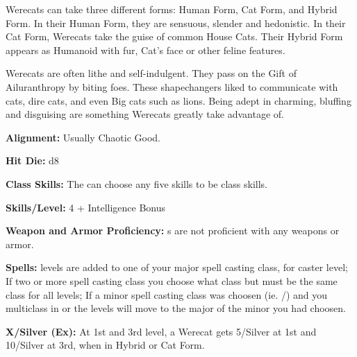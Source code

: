 
Werecats can take three different forms: Human Form, Cat Form, and Hybrid Form. In their Human Form, they are sensuous, slender and hedonistic. In their Cat Form, Werecats take the guise of common House Cats. Their Hybrid Form appears as Humanoid with fur, Cat's face or other feline features.

Werecats are often lithe and self-indulgent. They pass on the Gift of Ailuranthropy by biting foes. These shapechangers liked to communicate with cats, dire cats, and even Big cats such as lions. Being adept in charming, bluffing and disguising are something Werecats greatly take advantage of.

\textbf{Alignment:} Usually Chaotic Good.

\textbf{Hit Die:} d8

\textbf{Class Skills:} The \currentclassname{} can choose any five skills to be class skills.

\textbf{Skills/Level:} 4 + Intelligence Bonus

\modebab{}
\poorfor{}
\goodref{}
\poorwil{}

\begin{classtable}
\end{classtable}

\classfeatures

\textbf{Weapon and Armor Proficiency:} \currentclassname{}s are not proficient with any weapons or armor.

\textbf{Spells:} \currentclassname{} levels are added to one of your major spell casting class, for caster level; If two or more spell casting class you choose what class but must be the same class for all \currentclassname{} levels; If a minor spell casting class was choosen (ie. /) and you multiclass in  or  the \currentclassname{} levels will move to the major of the minor you had choosen.

\textbf{ X/Silver (Ex):} At 1st and 3rd level, a Werecat gets  5/Silver at 1st and 10/Silver at 3rd, when in Hybrid or Cat Form.

